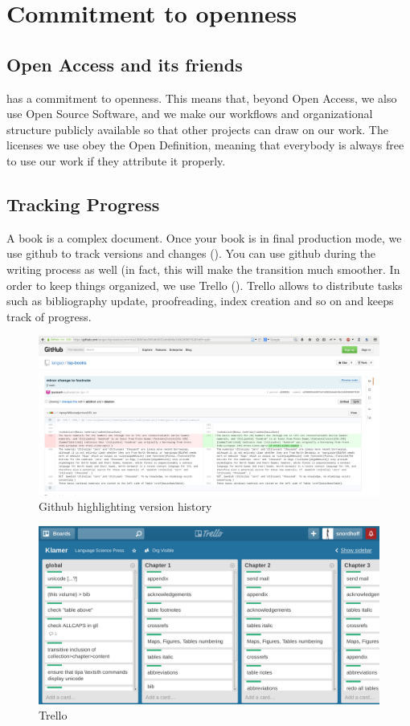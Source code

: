 \chapter{Commitment to openness}
\section{Open Access and its friends}
\lsp has a commitment to openness. This means that, beyond Open Access, we also use Open Source Software, and we make our workflows and organizational structure publicly available so that other projects can draw on our work. The licenses we use obey the Open Definition, meaning that everybody is always free to use our work if they attribute it properly.




\section{Tracking Progress}
A book is a complex document. Once your book is in final production mode, we use github to track versions and changes (). You can use github during the writing process as well (in fact, this will make the transition much smoother. In order to keep things organized, we use Trello (). Trello allows to distribute tasks such as bibliography update, proofreading, index creation and so on and keeps track of progress.

\begin{figure}
\caption{Github highlighting version history}
\label{fig:latex:github}
 \includegraphics[width=\textwidth]{github.png}
\end{figure}

\begin{figure}
\caption{Trello}
\label{fig:latex:trello}
 \includegraphics[width=\textwidth]{trello.png}
\end{figure}

